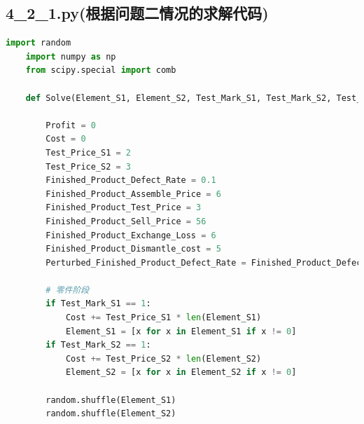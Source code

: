\documentclass[withoutpreface,bwprint]{cumcmthesis} %
\begin{document}
\begin{appendices}
\subsection{4\_2\_1.py(根据问题二情况的求解代码)}

\begin{lstlisting}[language=python]
	import random
	import numpy as np
	from scipy.special import comb
	
	def Solve(Element_S1, Element_S2, Test_Mark_S1, Test_Mark_S2, Test_Mark_Finished_Product, Dismantle_Mark_Finished_Product, Exchange_Quantity):
	
		Profit = 0
		Cost = 0
		Test_Price_S1 = 2
		Test_Price_S2 = 3
		Finished_Product_Defect_Rate = 0.1
		Finished_Product_Assemble_Price = 6
		Finished_Product_Test_Price = 3
		Finished_Product_Sell_Price = 56
		Finished_Product_Exchange_Loss = 6
		Finished_Product_Dismantle_cost = 5
		Perturbed_Finished_Product_Defect_Rate = Finished_Product_Defect_Rate + np.random.normal(0, 0.01)
	
		# 零件阶段
		if Test_Mark_S1 == 1:
			Cost += Test_Price_S1 * len(Element_S1)
			Element_S1 = [x for x in Element_S1 if x != 0]
		if Test_Mark_S2 == 1:
			Cost += Test_Price_S2 * len(Element_S2)
			Element_S2 = [x for x in Element_S2 if x != 0]
	
		random.shuffle(Element_S1)
		random.shuffle(Element_S2)
	

\end{lstlisting}
\end{appendices}
\end{document}

